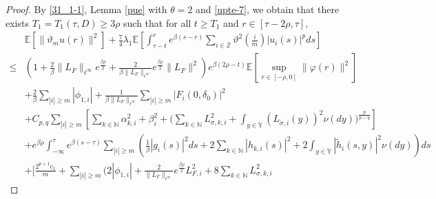 \documentclass[11pt]{article}
\numberwithin{equation}{section}
\theoremstyle{plain}
\begin{document}
\begin{proof}
 By \eqref{31_1-1}, Lemma \ref{pue} with $\theta =2$ and \eqref{upte-7},
 we obtain that there exists $T_1 = T_1(\tau, D) \ge 3\rho$ such that for all $t \ge T_1$ and $r \in [\tau-2\rho, \tau]$,
 \begin{align}\label{upte-8}
        & \mathbb{E} \left[ \| \vartheta_m  u(r)\|^2 \right]
          + \frac{7}{4} \lambda_1 \mathbb{E}
                          \left[ \int_{\tau-t}^{r} e^{\beta (s-r)}
                                    \sum_{i \in \mathbb{Z}}
                                         {\vartheta}^2(\frac{i}{m}) |u_i(s)|^p ds
                          \right]  \nonumber\\
   \le & \left( 1 + \frac{2}{\beta} \|L_{F}\|_{\ell^\infty} e^{\frac{\beta \rho}{2} }
                        + \frac{2}{ \beta \|L_{F}\|_{\ell^\infty} } e^{\frac{\beta \rho}{2} } \|L_{F}\|^2
            \right)
            e^{\beta (2\rho-t)}
                    \mathbb{E} \left[ \sup_{r \in [-\rho, 0]}\|\varphi(r)\|^2 \right]  \nonumber\\
        & + \frac{2}{\beta} \sum_{|i| \ge m} |\phi_{1,i}|
            + \frac{1}{\beta \|L_{F}\|_{\ell^\infty} } \sum_{|i| \ge m} |F_i(0,\delta_0)|^2
                   \nonumber\\
        & + C_{p,q} \sum_{|i| \ge m}
                \left[ \sum_{k \in \mathbb{N} } \alpha_{k,i}^2
                                   + \beta_i^2
                                   + \Big( \sum_{k \in \mathbb{N} } L^2_{\sigma,k,i} 
                                                + \int_{y \in \mathbb{Y} } (L_{\tilde{\sigma},i}(y) )^2 \nu(dy)
                                      \Big)^{ \frac{p}{p-q} }
                \right]  \nonumber\\
        & + e^{\beta \rho} \int_{-\infty}^{\tau} e^{\beta (s-\tau)}
               \sum_{|i| \ge m}
                     \left( \frac{1}{\beta} |g_i(s)|^2 ds
                               + 2 \sum_{k \in \mathbb{N} } |h_{k,i}(s)|^2 
                               + 2 \int_{y \in \mathbb{Y} } |\widetilde{h}_{i}(s,y)|^2 \nu(dy)
                     \right) ds  \nonumber\\
        & + \bigg[ \frac{2^{p+1} c_1}{m}
                          + \sum_{|i| \ge m} 
                                   \bigg( 2 |\phi_{1,i}|
                                              + \frac{2}{\|L_{F}\|_{\ell^\infty} } 
                                                                 e^{\frac{\beta \rho}{2} } 
                                                                        L_{F,i}^2
                                              + 8 \sum_{k \in \mathbb{N} } L_{\sigma, k,i}^2 

\end{align}
\end{proof}
\end{document}
